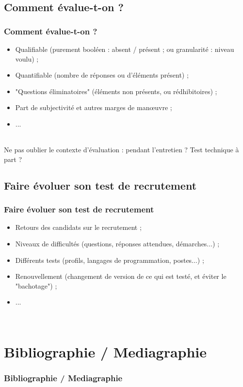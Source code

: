 \documentclass[slidetop,11pt]{beamer}
\begin{document}
\subsection{Comment {\'e}value-t-on ?}
\begin{frame}
	\frametitle{Comment {\'e}value-t-on ?}
	\begin{itemize}
		\item Qualifiable (purement bool{\'e}en : absent / pr{\'e}sent ; ou granularit{\'e} : niveau voulu) ; 
		\item Quantifiable (nombre de r{\'e}ponses ou d'{\'e}l{\'e}ments pr{\'e}sent) ; 
		\item "Questions {\'e}liminatoires" ({\'e}l{\'e}ments non pr{\'e}sents, ou r{\'e}dhibitoires) ; 
		\item Part de subjectivit{\'e} et autres marges de man\oe uvre ; 
		\item ... 
	\end{itemize}~\\
	
	Ne pas oublier le contexte d'{\'e}valuation : pendant l'entretien ? Test technique {\`a} part ?
\end{frame}

\subsection{Faire {\'e}voluer son test de recrutement}
\begin{frame}
	\frametitle{Faire {\'e}voluer son test de recrutement}
	\begin{itemize}
		\item Retours des candidats sur le recrutement ; 
		\item Niveaux de difficult{\'e}s (questions, r{\'e}ponses attendues, d{\'e}marches...) ; 
		\item Diff{\'e}rents tests (profils, langages de programmation, postes...) ; 
		\item Renouvellement (changement de version de ce qui est test{\'e}, et {\'e}viter le "bachotage") ; 
		\item ... 
	\end{itemize}~\\
	
\end{frame} 

\def\sectionPartBibliographie{Bibliographie / Mediagraphie}
\section{\sectionPartBibliographie}
\begin{frame}
	\frametitle{\sectionPartBibliographie}
	\nocite{*}
	
	
\end{frame}
\end{document}
